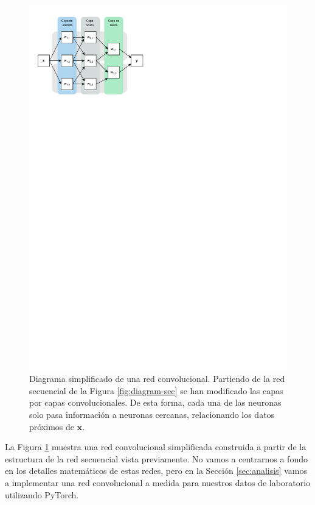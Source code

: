 \begin{figure}[h]
  \centering
  \includegraphics{figures/diagram-convolutional.pdf}
  \caption{Diagrama simplificado de una red convolucional. Partiendo de la red secuencial de la Figura \ref{fig:diagram-sec} se han modificado las capas por capas convolucionales. De esta forma, cada una de las neuronas solo pasa información a neuronas cercanas, relacionando los datos próximos de $ \mathbf{x} $.}
  \label{fig:diagram-conv}
\end{figure}

La Figura \ref{fig:diagram-conv} muestra una red convolucional simplificada construida a partir de la estructura de la red secuencial vista previamente. No vamos a centrarnos a fondo en los detalles matemáticos de estas redes, pero en la Sección \ref{sec:analisis} vamos a implementar una red convolucional a medida para nuestros datos de laboratorio utilizando PyTorch.